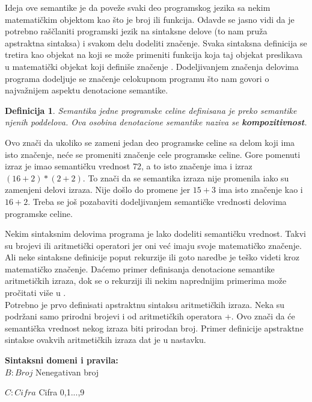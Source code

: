 \documentclass[a4paper]{article}
\newtheorem{definicija}{Definicija}[section]
\begin{document}
{Ideja ove semantike je da poveže svaki deo programskog jezika sa nekim matematičkim objektom kao što je broj ili funkcija. Odavde se jasno vidi da je potrebno raščlaniti programski jezik na sintaksne delove (to nam pruža apstraktna sintaksa) i svakom delu dodeliti značenje. Svaka sintaksna definicija se tretira kao objekat na koji se može primeniti funkcija koja taj objekat preslikava u matematički objekat koji definiše značenje \cite{parezanovic}. Dodeljivanjem značenja delovima programa dodeljuje se značenje celokupnom programu što nam govori o najvažnijem aspektu denotacione semantike.
\begin{definicija}
Semantika jedne programske celine definisana je preko semantike njenih poddelova. Ova osobina denotacione semantike naziva se \textbf{kompozitivnost}.
\end{definicija}

Ovo znači da ukoliko se zameni jedan deo programske celine sa delom koji ima isto značenje, neće se promeniti značenje cele programske celine. Gore pomenuti izraz je imao semantičku vrednost 72, a to isto značenje ima i izraz $ (16+2)*(2+2) $. To znači da se semantika izraza nije promenila iako su zamenjeni delovi izraza. Nije došlo do promene jer $ 15+3 $ ima isto značenje kao i $ 16+2 $. Treba se još pozabaviti dodeljivanjem semantičke vrednosti delovima programske celine.

Nekim sintaksnim delovima programa je lako dodeliti semantičku vrednost. Takvi su brojevi ili aritmetički operatori jer oni već imaju svoje matematičko značenje. Ali neke sintaksne definicije poput rekurzije ili goto naredbe je teško videti kroz matematičko značenje. Daćemo primer definisanja denotacione semantike aritmetičkih izraza, dok se o rekurziji ili nekim naprednijim primerima može pročitati više u \cite{nielson}.\\


Potrebno je prvo definisati apstraktnu sintaksu aritmetičkih izraza. Neka su podržani samo prirodni brojevi i od aritmetičkih operatora +. Ovo znači da će semantička vrednost nekog izraza biti prirodan broj. Primer definicije apstraktne sintakse ovakvih aritmetičkih izraza dat je u nastavku.


\begin{tcolorbox}
\textbf{Sintaksni domeni i pravila:}
\\

$B: Broj $  \qquad\qquad Nenegativan broj

$C: Cifra $ \qquad\qquad Cifra 0,1...,9


\end{tcolorbox}}
\end{document}

